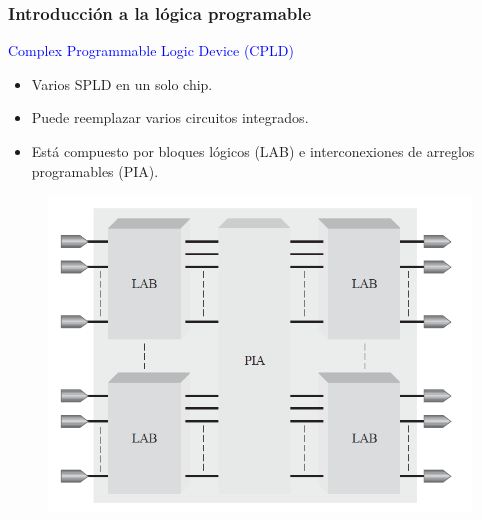 \documentclass[10.5pt,scale=1.0,t,aspectratio=169,hyperref={pdfpagelabels=false}]{beamer}
\begin{document}
\begin{frame}
	\frametitle{Introducción a la lógica programable}
	\vspace{-0.1in}
\textcolor{blue}{\large Complex Programmable Logic Device (CPLD)} \\
\begin{itemize}
	\item Varios SPLD en un solo chip.
	\item Puede reemplazar varios circuitos integrados.
	\item Está compuesto por bloques lógicos (LAB) e interconexiones  de arreglos programables (PIA).
\end{itemize}
\begin{figure}
	\centering
	\includegraphics[scale=0.5]{CPLD}
\end{figure}
\end{frame}
\end{document}
